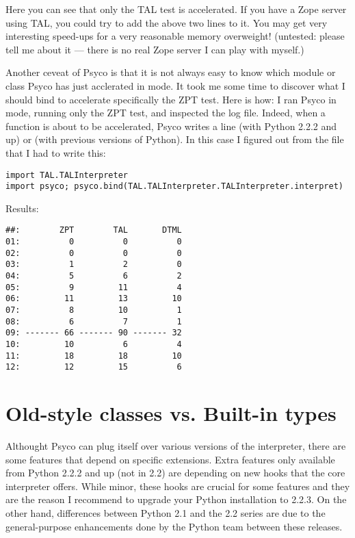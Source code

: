 \documentclass{manual}
\begin{document}
Here you can see that only the TAL test is accelerated.  If you have a Zope server using TAL, you could try to add the above two lines to it.  You may get very interesting speed-ups for a very reasonable memory overweight!  (untested: please tell me about it --- there is no real Zope server I can play with myself.)

Another ceveat of Psyco is that it is not always easy to know which module or class Psyco has just acclerated in  mode.  It took me some time to discover what I should bind to accelerate specifically the ZPT test.  Here is how: I ran Psyco in  mode, running only the ZPT test, and inspected the log file.  Indeed, when a function is about to be accelerated, Psyco writes a line  (with Python 2.2.2 and up) or  (with previous versions of Python).  In this case I figured out from the  file that I had to write this:

\begin{verbatim}
import TAL.TALInterpreter
import psyco; psyco.bind(TAL.TALInterpreter.TALInterpreter.interpret)
\end{verbatim}

Results:

\begin{verbatim}
##:        ZPT        TAL       DTML
01:          0          0          0
02:          0          0          0
03:          1          2          0
04:          5          6          2
05:          9         11          4
06:         11         13         10
07:          8         10          1
08:          6          7          1
09: ------- 66 ------- 90 ------- 32
10:         10          6          4
11:         18         18         10
12:         12         15          6
\end{verbatim}


\section{Old-style classes vs. Built-in types}\label{metaclass}

Althought Psyco can plug itself over various versions of the interpreter, there are some features that depend on specific extensions.  Extra features only available from Python 2.2.2 and up (not in 2.2) are depending on new hooks that the core interpreter offers.  While minor, these hooks are crucial for some features and they are the reason I recommend to upgrade your Python installation to 2.2.3.  On the other hand, differences between Python 2.1 and the 2.2 series are due to the general-purpose enhancements done by the Python team between these releases.
\end{document}
